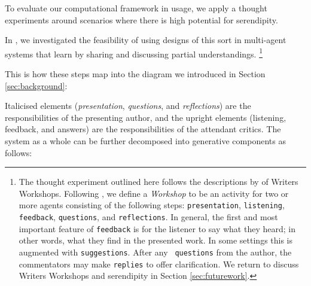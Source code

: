 To evaluate our computational framework in usage, we apply a thought experiments around scenarios where there is high potential for serendipity.

In \cite{poetry-workshop}, we investigated the feasibility of using
designs of this sort in multi-agent systems that learn by sharing and
discussing partial understandings.  %
\footnote{The thought experiment outlined here follows the descriptions by  of Writers Workshops. Following , we define a \emph{Workshop} to be an activity for two or more agents consisting of the following steps: {\tt presentation}, {\tt listening}, {\tt feedback}, {\tt questions},
and {\tt reflections}.  In general, the first and most important
feature of {\tt feedback} is for the listener to say what they heard;
in other words, what they find in the presented work.  In some
settings this is augmented with {\tt suggestions}.  After any {\tt
  questions} from the author, the commentators may make {\tt replies}
to offer clarification. We return to discuss Writers Workshops and serendipity in Section \ref{sec:futurework}.} 

This is how these steps map into the diagram
we introduced in Section \ref{sec:background}:



Italicised elements (\emph{presentation}, \emph{questions}, and
\emph{reflections}) are the responsibilities of the presenting author,
and the upright elements (listening, feedback, and
answers) are the responsibilities of the attendant critics.
%
The system as a whole can be further decomposed into generative
components as follows:

\bigskip



